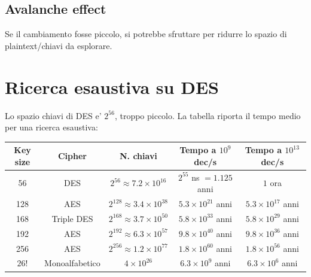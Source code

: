 \subsection{Avalanche effect}
Se il cambiamento fosse piccolo, si potrebbe sfruttare per ridurre lo spazio di plaintext/chiavi da esplorare.

\section{Ricerca esaustiva su DES}
Lo spazio chiavi di DES e' $ 2^{56} $, troppo piccolo. La tabella riporta il tempo medio per una ricerca esaustiva:
\begin{center}
  \footnotesize
  \begin{tabular}{|c|c|c|c|c|}
    \hline
    \textbf{Key size} & \textbf{Cipher} & \textbf{N. chiavi} & \textbf{Tempo a $ 10^9 $ dec/s} & \textbf{Tempo a $ 10^{13} $ dec/s} \\ \hline
    56  & DES        & $ 2^{56} \approx 7.2 \times 10^{16} $ & $ 2^{55} $ ns $ = 1.125 $ anni & $ 1 $ ora \\ \hline
    128 & AES        & $ 2^{128} \approx 3.4 \times 10^{38} $ & $ 5.3 \times 10^{21} $ anni & $ 5.3 \times 10^{17} $ anni \\ \hline
    168 & Triple DES & $ 2^{168} \approx 3.7 \times 10^{50} $ & $ 5.8 \times 10^{33} $ anni & $ 5.8 \times 10^{29} $ anni \\ \hline
    192 & AES        & $ 2^{192} \approx 6.3 \times 10^{57} $ & $ 9.8 \times 10^{40} $ anni & $ 9.8 \times 10^{36} $ anni \\ \hline
    256 & AES        & $ 2^{256} \approx 1.2 \times 10^{77} $ & $ 1.8 \times 10^{60} $ anni & $ 1.8 \times 10^{56} $ anni \\ \hline
    $ 26! $ & Monoalfabetico & $ 4 \times 10^{26} $ & $ 6.3 \times 10^{9} $ anni & $ 6.3 \times 10^{6} $ anni \\ \hline
  \end{tabular}
\end{center}

